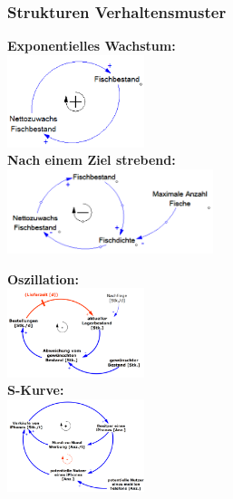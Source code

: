 \subsubsection{Strukturen Verhaltensmuster}
\begin{multicols}{2}
	\textbf{Exponentielles Wachstum:} \\
	\includegraphics[width=0.3\textwidth]{pictures/struktur_1} \\ 
	\textbf{Nach einem Ziel strebend:} \\
	\includegraphics[width=0.45\textwidth]{pictures/struktur_2} 
\end{multicols}	
\begin{multicols}{2}
	\textbf{Oszillation:} \\
	\includegraphics[width=0.3\textwidth]{pictures/struktur_3} \\
	\textbf{S-Kurve:} \\
	\includegraphics[width=0.3\textwidth]{pictures/struktur_4} 
\end{multicols}	
